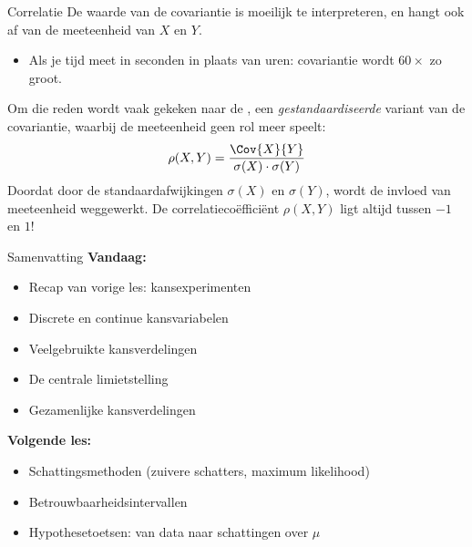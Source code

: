     \begin{frame}{Correlatie}
        De waarde van de covariantie is moeilijk te interpreteren, en hangt ook af van de meeteenheid van $X$ en $Y$.
        \begin{itemize}
            \item Als je tijd meet in seconden in plaats van uren: covariantie wordt $60 \times$ zo groot.
        \end{itemize}

        Om die reden wordt vaak gekeken naar de , een \emph{gestandaardiseerde} variant van de covariantie,
        waarbij de meeteenheid geen rol meer speelt:
        \begin{align*}
            \rho(X, Y) = \frac{\Cov{X}{Y}}{\sigma(X)\cdot \sigma(Y)}
        \end{align*}
        Doordat door de standaardafwijkingen $\sigma(X)$ en $\sigma(Y)$, wordt de invloed van meeteenheid weggewerkt.
        \vfill
        De correlatiecoëfficiënt $\rho(X, Y)$ ligt altijd tussen $-1$ en $1$!
    \end{frame}

    \begin{frame}{Samenvatting}
        \textbf{Vandaag:}
        \begin{itemize}
            \item Recap van vorige les: kansexperimenten
            \item Discrete en continue kansvariabelen
            \item Veelgebruikte kansverdelingen
            \item De centrale limietstelling
            \item Gezamenlijke kansverdelingen
        \end{itemize}
        \vfill
        \textbf{Volgende les:}
        \begin{itemize}
            \item Schattingsmethoden (zuivere schatters, maximum likelihood)
            \item Betrouwbaarheidsintervallen
            \item Hypothesetoetsen: van data naar schattingen over $\mu$
        \end{itemize}
    \end{frame}

